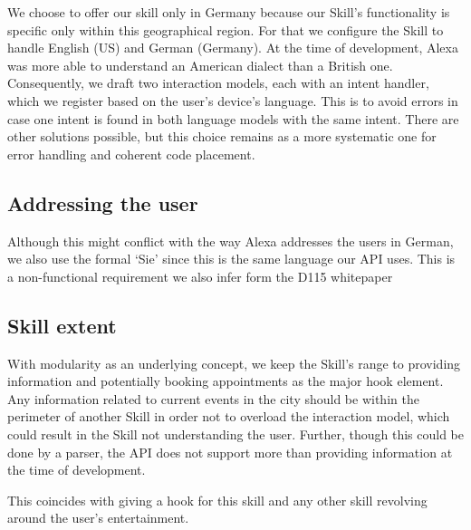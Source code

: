 We choose to offer our skill only in Germany because our Skill's functionality is specific only within this geographical region. For that we configure the Skill to handle English (US) and German (Germany).
At the time of development, Alexa was more able to understand an American dialect than a British one.
Consequently, we draft two interaction models, each with an intent handler, which we register based on the user's device's language. This is to avoid errors in case one intent is found in both language models with the same intent.
There are other solutions possible, but this choice remains as a more systematic one for error handling and coherent code placement.






\subsection*{Addressing the user}
Although this might conflict with the way Alexa addresses the users in German, we also use the formal `Sie' since this is the same language our API uses. This is a non-functional requirement we also infer form the D115 whitepaper\cite{d115}



\subsection*{Skill extent}
With modularity as an underlying concept, we keep the Skill's range to providing information and potentially booking appointments as the major hook element. Any information related to current events in the city should be within the perimeter of another Skill in order not to overload the interaction model, which could result in the Skill not understanding the user. Further, though this could be done by a parser, the API does not support more than providing information at the time of development.

This coincides with giving a hook for this skill and any other skill revolving around the user's entertainment.




